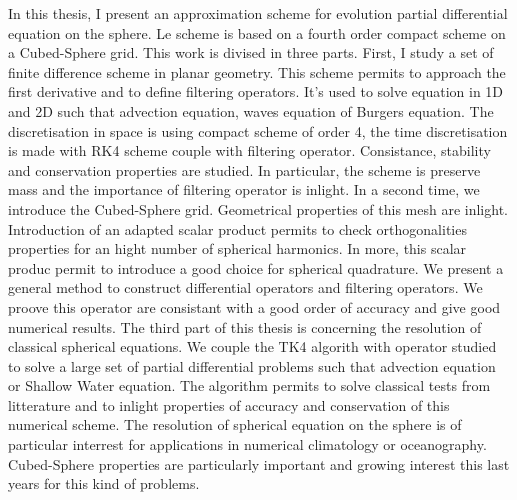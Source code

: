 \documentclass[11pt]{thesul}
\begin{document}
\begin{ThesisAbstract}
\begin{EnglishAbstract}
    In this thesis, I present an approximation scheme for evolution partial differential equation on the sphere. Le scheme is based on a fourth order compact scheme on a Cubed-Sphere grid. This work is divised in three parts.
	First, I study a set of finite difference scheme in planar geometry. This scheme permits to approach the first derivative and to define filtering operators. It’s used to solve equation in 1D and 2D such that advection equation, waves equation of Burgers equation. The discretisation in space is using compact scheme of order 4, the time discretisation is made with RK4 scheme couple with filtering operator. Consistance, stability and conservation properties are studied. In particular, the scheme is preserve mass and the importance of filtering operator is inlight.
	In a second time, we introduce the Cubed-Sphere grid. Geometrical properties of this mesh are inlight. Introduction of an adapted scalar product permits to check orthogonalities properties for an hight number of spherical harmonics. In more, this scalar produc permit to introduce a good choice for spherical quadrature. We present a general method to construct differential operators and filtering operators. We proove this operator are consistant with a good order of accuracy and give good numerical results.
	The third part of this thesis is concerning the resolution of classical spherical equations. We couple the TK4 algorith with operator studied to solve a large set of partial differential problems such that advection equation or Shallow Water equation. The algorithm permits to solve classical tests from litterature and to inlight properties of accuracy and conservation of this numerical scheme.
	The resolution of spherical equation on the sphere is of particular interrest for applications in  numerical climatology or oceanography. Cubed-Sphere properties are particularly important and growing interest this last years for this kind of problems.
  \end{EnglishAbstract}
\end{ThesisAbstract}
\end{document}
